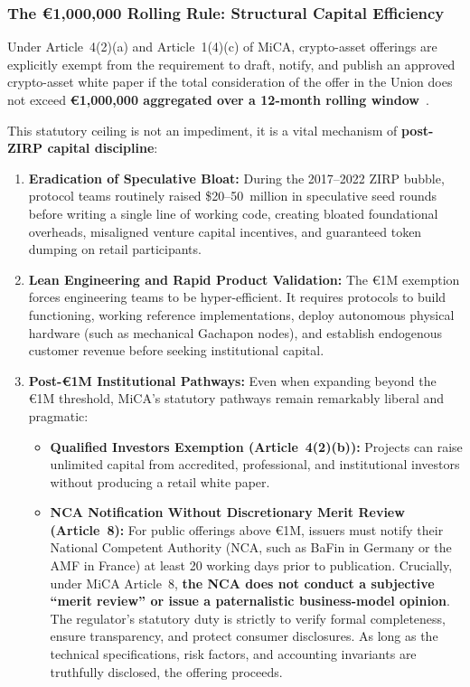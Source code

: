 \documentclass[a4paper,11pt,twoside,parskip=half-,headings=small]{scrartcl}
\begin{document}
\subsubsection{The €1,000,000 Rolling Rule: Structural Capital Efficiency}
Under Article~4(2)(a) and Article~1(4)(c) of MiCA, crypto-asset offerings are explicitly exempt from the requirement to draft, notify, and publish an approved crypto-asset white paper if the total consideration of the offer in the Union does not exceed \textbf{€1,000,000 aggregated over a 12-month rolling window}~\cite{mica2023}.

This statutory ceiling is not an impediment, it is a vital mechanism of \textbf{post-ZIRP capital discipline}:
\begin{enumerate}
  \item \textbf{Eradication of Speculative Bloat:} During the 2017--2022 ZIRP bubble, protocol teams routinely raised \$20--50~million in speculative seed rounds before writing a single line of working code, creating bloated foundational overheads, misaligned venture capital incentives, and guaranteed token dumping on retail participants.
  \item \textbf{Lean Engineering and Rapid Product Validation:} The €1M exemption forces engineering teams to be hyper-efficient. It requires protocols to build functioning, working reference implementations, deploy autonomous physical hardware (such as mechanical Gachapon nodes), and establish endogenous customer revenue before seeking institutional capital.
  \item \textbf{Post-€1M Institutional Pathways:} Even when expanding beyond the €1M threshold, MiCA's statutory pathways remain remarkably liberal and pragmatic:
  \begin{itemize}
    \item \textbf{Qualified Investors Exemption (Article~4(2)(b)):} Projects can raise unlimited capital from accredited, professional, and institutional investors without producing a retail white paper.
    \item \textbf{NCA Notification Without Discretionary Merit Review (Article~8):} For public offerings above €1M, issuers must notify their National Competent Authority (NCA, such as BaFin in Germany or the AMF in France) at least 20 working days prior to publication. Crucially, under MiCA Article~8, \textbf{the NCA does not conduct a subjective ``merit review'' or issue a paternalistic business-model opinion}. The regulator's statutory duty is strictly to verify formal completeness, ensure transparency, and protect consumer disclosures. As long as the technical specifications, risk factors, and accounting invariants are truthfully disclosed, the offering proceeds.
  \end{itemize}
\end{enumerate}
\end{document}
